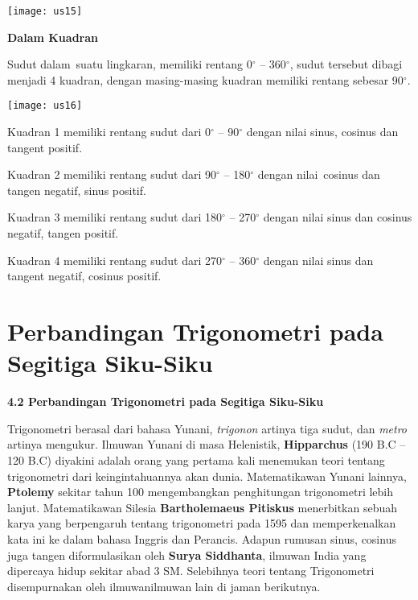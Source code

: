 \documentclass[11pt,fleqn]{book} %
\begin{document}
\begin{myEnumerate}
\begin{itemize}
\noindent \texttt{[image: us15]}

\noindent \textbf{Dalam Kuadran}

\noindent Sudut dalam~suatu lingkaran, memiliki rentang 0${}^\circ$ -- 360${}^\circ$, sudut tersebut dibagi menjadi 4 kuadran, dengan masing-masing kuadran memiliki rentang sebesar 90${}^\circ$.

\noindent \texttt{[image: us16]}\textbf{}

\noindent \textbf{}

\noindent Kuadran 1 memiliki rentang sudut dari 0${}^\circ$ -- 90${}^\circ$ dengan nilai sinus, cosinus dan tangent positif.

\noindent Kuadran 2 memiliki rentang sudut dari 90${}^\circ$ -- 180${}^\circ$ dengan nilai~cosinus dan tangen negatif, sinus positif.

\noindent Kuadran 3 memiliki rentang sudut dari 180${}^\circ$ -- 270${}^\circ$ dengan nilai sinus dan cosinus negatif, tangen positif.

\noindent Kuadran 4 memiliki rentang sudut dari 270${}^\circ$ -- 360${}^\circ$ dengan nilai sinus dan tangent negatif, cosinus positif.

\noindent 

\noindent 


\section{Perbandingan Trigonometri pada Segitiga Siku-Siku}

\noindent \textbf{4.2 Perbandingan Trigonometri pada Segitiga Siku-Siku}

\textbf{ }

\textbf{ }Trigonometri berasal dari bahasa Yunani, \textit{trigonon }artinya tiga sudut, dan \textit{metro }artinya mengukur. Ilmuwan Yunani di masa Helenistik, \textbf{Hipparchus }(190 B.C -- 120 B.C) diyakini adalah orang yang pertama kali menemukan teori tentang trigonometri dari keingintahuannya akan dunia. Matematikawan Yunani lainnya, \textbf{Ptolemy }sekitar tahun 100 mengembangkan penghitungan trigonometri lebih lanjut. Matematikawan Silesia \textbf{Bartholemaeus Pitiskus} menerbitkan sebuah karya yang berpengaruh tentang trigonometri pada 1595 dan memperkenalkan kata ini ke dalam bahasa Inggris dan Perancis. Adapun rumusan sinus, cosinus juga tangen diformulasikan oleh \textbf{Surya Siddhanta}, ilmuwan India yang dipercaya hidup sekitar abad 3 SM. Selebihnya teori tentang Trigonometri disempurnakan oleh ilmuwanilmuwan lain di jaman berikutnya.


\end{itemize}
\end{myEnumerate}
\end{document}
